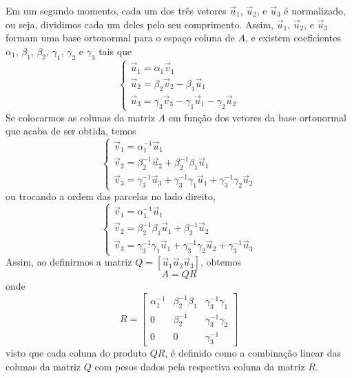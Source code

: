 \documentclass[../livro.tex]{subfiles}  %
\begin{document}
Em um segundo momento, cada um dos três vetores $\vec{u}_1$, $\vec{u}_2$, e $\vec{u}_3$ é normalizado, ou seja, dividimos cada um deles pelo seu comprimento. Assim, $\vec{u}_1$, $\vec{u}_2$, e $\vec{u}_3$ formam uma base ortonormal para o espaço coluna de $A$, e  existem coeficientes $\alpha_1$, $\beta_1$, $\beta_2$, $\gamma_1$, $\gamma_2$ e $\gamma_3$ tais que 
\begin{equation}
\begin{cases}
\vec{u}_1 = \alpha_1\vec{v}_1 \\ 
\vec{u}_2 = \beta_2 \vec{v}_2 - \beta_1 \vec{u}_1 \\
\vec{u}_3 = \gamma_3 \vec{v}_3 - \gamma_1 \vec{u}_1 - \gamma_2 \vec{u}_2
\end{cases}
\end{equation}
Se colocarmos as colunas da matriz $A$ em função dos vetores da base ortonormal que acaba de ser obtida, temos 
\begin{equation}
\begin{cases}
\vec{v}_1 = \alpha_1^{-1}\vec{u}_1 \\ 
\vec{v}_2 = \beta_2^{-1} \vec{u}_2 + \beta_2^{-1}\beta_1 \vec{u}_1 \\
\vec{v}_3 = \gamma_3^{-1} \vec{u}_3 + \gamma_3^{-1}\gamma_1 \vec{u}_1 + \gamma_3^{-1}\gamma_2 \vec{u}_2
\end{cases}
\end{equation}
ou trocando a ordem das parcelas no lado direito,
\begin{equation}
\begin{cases}
\vec{v}_1 = \alpha_1^{-1}\vec{u}_1 \\ 
\vec{v}_2 =  \beta_2^{-1}\beta_1 \vec{u}_1 + \beta_2^{-1} \vec{u}_2 \\
\vec{v}_3 =   \gamma_3^{-1}\gamma_1 \vec{u}_1 + \gamma_3^{-1}\gamma_2 \vec{u}_2 + \gamma_3^{-1} \vec{u}_3
\end{cases}
\end{equation}
Assim, ao definirmos a matriz $Q=[\vec{u}_1 \vec{u}_2  \vec{u}_3] $, obtemos \begin{equation}A=QR\end{equation}
onde 
\begin{equation}
R =
\begin{bmatrix}
\alpha_1^{-1}  & \beta_2^{-1}\beta_1  & \gamma_3^{-1}\gamma_1 \\
0 & \beta_2^{-1} & \gamma_3^{-1}\gamma_2 \\
0 & 0 & \gamma_3^{-1}
\end{bmatrix}
\end{equation}
visto que cada coluna do produto $QR$, é definido como a combinação linear das colunas da matriz $Q$ com pesos dados pela respectiva coluna da matriz $R$.
\end{document}

